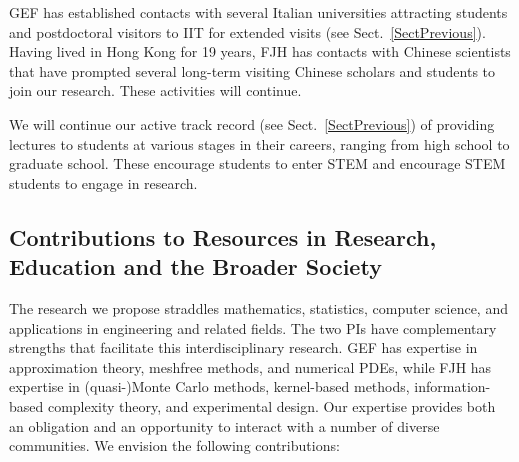 \documentclass[11pt]{NSFamsart}
\begin{document}
\begin{description}[leftmargin=0ex]
\item[Supervising Visitors]
GEF has established contacts with several Italian universities attracting students and postdoctoral visitors to IIT for extended visits (see Sect.~\ref{SectPrevious}). Having lived in Hong Kong for 19 years, FJH has contacts with Chinese scientists that have prompted several long-term visiting Chinese scholars and students to join our research.  These activities will continue.

\item[Giving Short Courses and Invited Lectures]
We will continue our active track record (see Sect.~\ref{SectPrevious}) of providing lectures to students at various stages in their careers, ranging from high school to graduate school. These encourage students to enter STEM and encourage STEM students to engage in research.

\end{description}

\subsection{Contributions to Resources in Research, Education and the Broader Society}

The research we propose straddles mathematics, statistics, computer science, and applications in engineering and related fields.  The two PIs have complementary strengths that facilitate this interdisciplinary research.  GEF has expertise in approximation theory, meshfree methods, and numerical PDEs, while FJH has expertise in (quasi-)Monte Carlo methods, kernel-based methods, information-based complexity theory, and experimental design. Our expertise provides both an obligation and an opportunity to interact with a number of diverse communities. We envision the following contributions:
\end{document}
